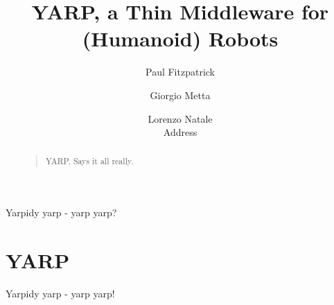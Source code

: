 \documentclass[letterpaper]{article}
\title{YARP, a Thin Middleware for (Humanoid) Robots}
\author{Paul Fitzpatrick \and Giorgio Metta \and Lorenzo Natale \\
Address}
\begin{document}
 
\maketitle
\begin{abstract}
\begin{quote}
YARP.  Says it all really.
\end{quote}
\end{abstract}

\noindent Yarpidy yarp - yarp yarp?

\section{YARP}
Yarpidy yarp - yarp yarp!
\end{document}
